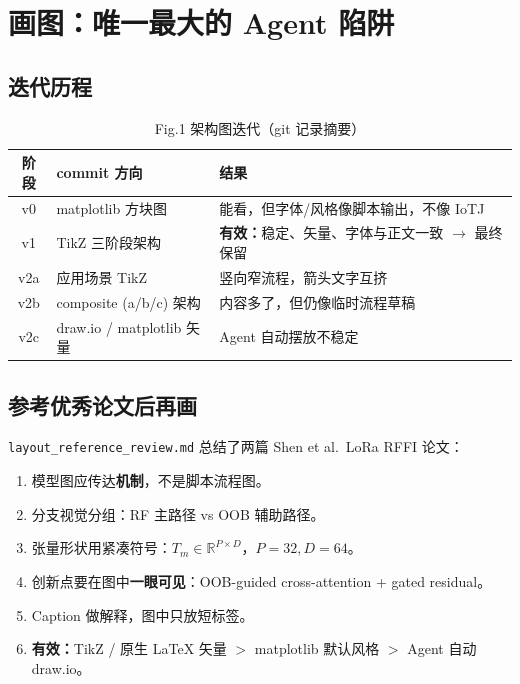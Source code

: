\documentclass[11pt,a4paper]{ctexart}
\newcommand{\good}[1]{\textcolor{green!50!black}{\textbf{有效：}#1}}
\begin{document}
\section{画图：唯一最大的 Agent 陷阱}
\label{sec:figures}

\subsection{迭代历程}
\begin{table}[htbp]
  \centering
  \small
  \caption{Fig.1 架构图迭代（git 记录摘要）}
  \begin{tabular}{@{}clp{7.5cm}@{}}
    \toprule
    \textbf{阶段} & \textbf{commit 方向} & \textbf{结果} \\
    \midrule
    v0 & matplotlib 方块图 & 能看，但字体/风格像脚本输出，不像 IoTJ \\
    v1 & TikZ 三阶段架构 & \good{稳定、矢量、字体与正文一致} $\to$ 最终保留 \\
    v2a & 应用场景 TikZ & 竖向窄流程，箭头文字互挤 \\
    v2b & composite (a/b/c) 架构 & 内容多了，但仍像临时流程草稿 \\
    v2c & draw.io / matplotlib 矢量 & Agent 自动摆放不稳定 \\
    \bottomrule
  \end{tabular}
\end{table}

\subsection{参考优秀论文后再画}
\texttt{layout\_reference\_review.md} 总结了两篇 Shen et al.\ LoRa RFFI 论文：
\begin{enumerate}
  \item 模型图应传达\textbf{机制}，不是脚本流程图。
  \item 分支视觉分组：RF 主路径 vs OOB 辅助路径。
  \item 张量形状用紧凑符号：$T_m\in\mathbb{R}^{P\times D}$，$P{=}32,D{=}64$。
  \item 创新点要在图中\textbf{一眼可见}：OOB-guided cross-attention + gated residual。
  \item Caption 做解释，图中只放短标签。
  \item \good{TikZ / 原生 LaTeX 矢量} $>$ matplotlib 默认风格 $>$ Agent 自动 draw.io。
\end{enumerate}
\end{document}
